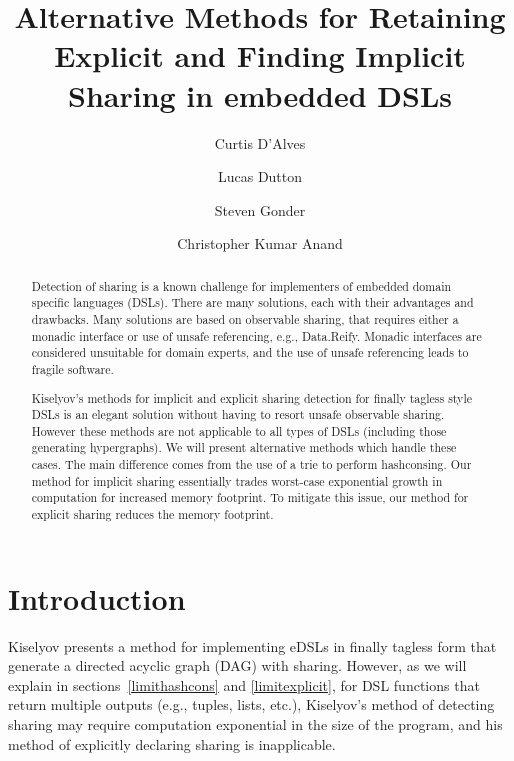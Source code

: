 \documentclass[runningheads]{llncs}
\begin{document}
\lstset{language=haskell}
%
\title{Alternative Methods for Retaining
    Explicit and Finding Implicit Sharing in embedded DSLs}
%
%
\author{Curtis D'Alves \and
Lucas Dutton \and
Steven Gonder \and
Christopher Kumar Anand
}
%
%
%
\maketitle              %
%
\begin{abstract}
  Detection of sharing is a known challenge for implementers of embedded domain
  specific languages (DSLs). There are many solutions, each with their
  advantages and drawbacks. Many solutions are based on observable sharing, that
  requires either a monadic interface or use of unsafe referencing, e.g.,
  Data.Reify. Monadic interfaces are considered unsuitable for domain experts, and
  the use of unsafe referencing leads to fragile software.

  Kiselyov's methods for implicit and explicit sharing detection for finally
  tagless style DSLs is an elegant solution without having to resort unsafe
  observable sharing. However these methods are not applicable to all types of
  DSLs (including those generating hypergraphs). We will present alternative
  methods which handle these cases. The main difference comes from the use of a
  trie to perform hashconsing. Our method for implicit sharing essentially
  trades worst-case exponential growth in computation for increased memory
  footprint. To mitigate this issue, our method for explicit sharing reduces the
  memory footprint.

\end{abstract}
%
%
%
\section{Introduction}

Kiselyov \cite{kiselyov:sharing}  presents a method for implementing
eDSLs in finally tagless form that generate a directed acyclic graph (DAG) with
sharing. 
However, as we will explain in sections~\ref{limithashcons} and
\ref{limitexplicit}, for DSL functions that return multiple
outputs (e.g., tuples, lists, etc.), Kiselyov's method of detecting sharing may require computation exponential in the size of the program,
and his method of explicitly declaring sharing is inapplicable.
\end{document}
